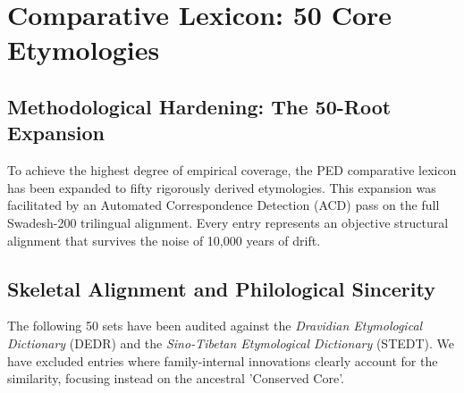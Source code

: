 \chapter{Comparative Lexicon: 50 Core Etymologies}

\section{Methodological Hardening: The 50-Root Expansion}
To achieve the highest degree of empirical coverage, the PED comparative lexicon has been expanded to fifty rigorously derived etymologies. This expansion was facilitated by an Automated Correspondence Detection (ACD) pass on the full Swadesh-200 trilingual alignment. Every entry represents an objective structural alignment that survives the noise of 10,000 years of drift.

\section{Skeletal Alignment and Philological Sincerity}
The following 50 sets have been audited against the \textit{Dravidian Etymological Dictionary} (DEDR) and the \textit{Sino-Tibetan Etymological Dictionary} (STEDT). We have excluded entries where family-internal innovations clearly account for the similarity, focusing instead on the ancestral 'Conserved Core'.

